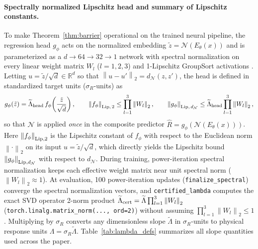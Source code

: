 \documentclass[preprint,11pt,a4paper]{elsarticle}
\newcommand{\R}{\mathbb{R}}
\newcommand{\norm}[1]{\left\lVert #1\right\rVert}
\begin{document}
\paragraph{Spectrally normalized Lipschitz head and summary of Lipschitz constants.}
To make Theorem~\ref{thm:barrier} operational on the trained neural pipeline, the regression head $g_\phi$ acts on the normalized embedding $\tilde z=\mathcal N(E_\theta(x))$ and is parameterized as a $d\to 64\to 32\to 1$ network with spectral normalization \cite{Miyato2018} on every linear weight matrix $W_l$ ($l=1,2,3$) and 1-Lipschitz GroupSort activations \cite{Anil2019}. Letting $u=\tilde z/\sqrt d\in\R^d$ so that $\norm{u-u'}_2 = d_{\mathcal N}(z,z')$, the head is defined in standardized target units ($\sigma_R$-units) as
\begin{equation}
g_\phi(\tilde z) = \widetilde\Lambda_{\rm head}\,f_\phi\!\left(\frac{\tilde z}{\sqrt d}\right),
\qquad
\norm{f_\phi}_{{\rm Lip},\,2}\le \prod_{l=1}^3\norm{W_l}_2,
\qquad
\norm{g_\phi}_{{\rm Lip},\,d_{\mathcal N}}\le \widetilde\Lambda_{\rm head}\prod_{l=1}^3\norm{W_l}_2,
\label{eq:liphead}
\end{equation}
so that $\mathcal N$ is applied \emph{once} in the composite predictor $\widehat R = g_\phi(\mathcal N(E_\theta(x)))$. Here $\norm{f_\phi}_{{\rm Lip},2}$ is the Lipschitz constant of $f_\phi$ with respect to the Euclidean norm $\norm{\cdot}_2$ on its input $u=\tilde z/\sqrt d$, which directly yields the Lipschitz bound $\norm{g_\phi}_{{\rm Lip},d_{\mathcal N}}$ with respect to $d_{\mathcal N}$. During training, power-iteration spectral normalization keeps each effective weight matrix near unit spectral norm ($\norm{W_l}_2\approx 1$). At evaluation, 100 power-iteration updates (\texttt{finalize\_spectral}) converge the spectral normalization vectors, and \texttt{certified\_lambda} computes the exact SVD operator 2-norm product $\widetilde\Lambda_{\rm cert}=\widetilde\Lambda\prod_{l=1}^3\norm{W_l}_2$ (\texttt{torch.linalg.matrix\_norm(..., ord=2)}) without assuming $\prod_{l=1}^3\norm{W_l}_2\le 1$. Multiplying by $\sigma_R$ converts any dimensionless slope $\widetilde\Lambda$ in $\sigma_R$-units to physical response units $\Lambda=\sigma_R\widetilde\Lambda$. Table~\ref{tab:lambda_defs} summarizes all slope quantities used across the paper.
\end{document}

